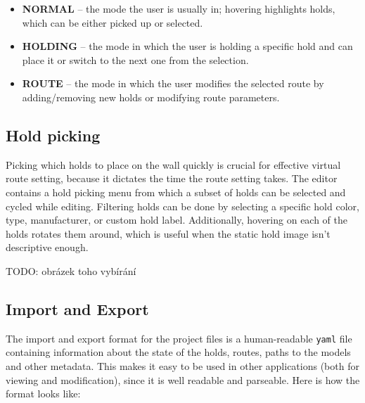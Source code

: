 \begin{itemize}
		\item \textbf{NORMAL} -- the mode the user is usually in; hovering highlights holds, which can be either picked up or selected.
		\item \textbf{HOLDING} -- the mode in which the user is holding a specific hold and can place it or switch to the next one from the selection.
		\item \textbf{ROUTE} -- the mode in which the user modifies the selected route by adding/removing new holds or modifying route parameters.
\end{itemize}

\subsection{Hold picking}
Picking which holds to place on the wall quickly is crucial for effective virtual route setting, because it dictates the time the route setting takes.
The editor contains a hold picking menu from which a subset of holds can be selected and cycled while editing.
Filtering holds can be done by selecting a specific hold color, type, manufacturer, or custom hold label.
Additionally, hovering on each of the holds rotates them around, which is useful when the static hold image isn't descriptive enough.

TODO: obrázek toho vybírání


\subsection{Import and Export}
The import and export format for the project files is a human-readable \verb|yaml| file containing information about the state of the holds, routes, paths to the models and other metadata.
This makes it easy to be used in other applications (both for viewing and modification), since it is well readable and parseable.
Here is how the format looks like:


